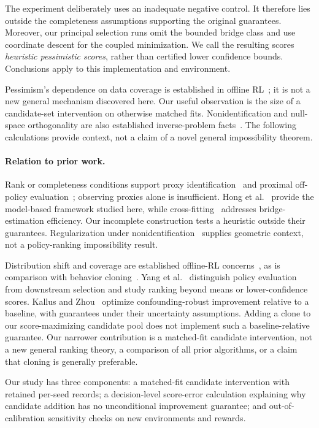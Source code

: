 \documentclass[11pt]{article}
\begin{document}
The experiment deliberately uses an inadequate negative control. It therefore
lies outside the completeness assumptions supporting the original guarantees.
Moreover, our principal selection runs omit the bounded bridge class and use
coordinate descent for the coupled minimization. We call the resulting scores
\emph{heuristic pessimistic scores}, rather than certified lower confidence
bounds. Conclusions apply to this implementation and environment.

Pessimism's dependence on data coverage is established in offline
RL~\cite{jin}; it is not a new general mechanism discovered here. Our useful
observation is the size of a candidate-set intervention on otherwise matched
fits. Nonidentification and null-space orthogonality are also established
inverse-problem facts~\cite{babii}. The following calculations provide context,
not a claim of a novel general impossibility theorem.

\paragraph{Relation to prior work.}
Rank or completeness conditions support proxy identification~\cite{miao,tchetgen}
and proximal off-policy evaluation~\cite{bennett}; observing proxies alone is
insufficient. Hong et al.~\cite{hong} provide the model-based framework studied
here, while cross-fitting~\cite{venkatesh} addresses bridge-estimation efficiency.
Our incomplete construction tests a heuristic outside their guarantees.
Regularization under nonidentification~\cite{babii} supplies geometric context,
not a policy-ranking impossibility result.

Distribution shift and coverage are established offline-RL concerns~\cite{levine,jin},
as is comparison with behavior cloning~\cite{kumar}. Yang et al.~\cite{yang}
distinguish policy evaluation from downstream selection and study ranking
beyond means or lower-confidence scores. Kallus and Zhou~\cite{kalluszhou}
optimize confounding-robust improvement relative to a baseline, with guarantees
under their uncertainty assumptions. Adding a clone to our score-maximizing
candidate pool does not implement such a baseline-relative guarantee.
Our narrower contribution is a matched-fit candidate intervention, not a new
general ranking theory, a comparison of all prior algorithms, or a claim that
cloning is generally preferable.

Our study has three components: a matched-fit candidate intervention with
retained per-seed records; a decision-level score-error calculation explaining
why candidate addition has no unconditional improvement guarantee; and
out-of-calibration sensitivity checks on new environments and rewards.
\end{document}
